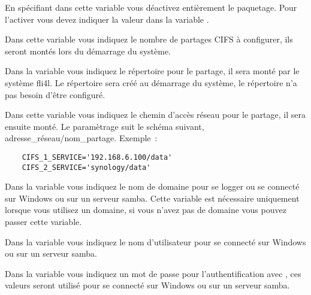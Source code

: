 \begin{description}

  En spécifiant  dans cette variable vous déactivez entièrement le paquetage.
  Pour l'activer vous devez indiquer la valeur  dans la variable .

  Dans cette variable vous indiquez le nombre de partages CIFS à configurer, ils
  seront montés lors du démarrage du système.

  Dans la variable  vous indiquez le répertoire
  pour le partage, il sera monté par le système fli4l. Le répertoire sera créé au
  démarrage du système, le répertoire n'a pas besoin d'être configuré.

  Dans cette variable vous indiquez le chemin d'accès réseau pour le partage,
  il sera ensuite monté. Le paramètrage suit le schéma suivant,
  adresse\_réseau/nom\_partage. Exemple~:

  \begin{example}
  \begin{verbatim}
    CIFS_1_SERVICE='192.168.6.100/data'
    CIFS_2_SERVICE='synology/data'
  \end{verbatim}
  \end{example}

  Dans la variable  vous indiquez le nom de domaine
  pour se logger ou se connecté sur Windows ou sur un serveur samba. Cette
  variable est nécessaire uniquement lorsque vous utilisez un domaine, si vous
  n'avez pas de domaine vous pouvez passer cette variable.

  Dans la variable  vous indiquez le nom d'utilisateur
  pour se connecté sur Windows ou sur un serveur samba.

  Dans la variable  vous indiquez un mot de passe
  pour l'authentification avec , ces valeurs seront utilisé
  pour se connecté sur Windows ou sur un serveur samba.


\end{description}
